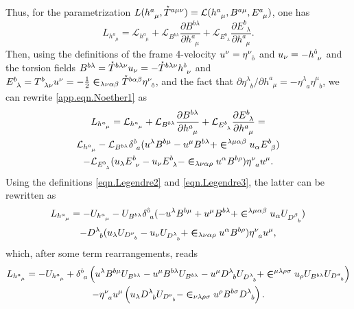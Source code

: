 \documentclass[
10pt, %
a4paper, %
oneside, %
headinclude,footinclude, %
BCOR5mm, %
]{scrartcl}
\newcommand{\tetrsymbol}{h}
\newcommand{\itetrsymbol}{\eta}
\newcommand{\itetr}[2]{\itetrsymbol^{#1}_{\phantom{#1}#2}}
\newcommand{\tetr}[2]{\tetrsymbol^{#1}_{\phantom{#1}#2}}
\newcommand{\Tors}[2]{T^{#1}_{\phantom{a}#2}}
\newcommand{\ET}[2]{E^{#1}_{\phantom{#1}#2}}	%
\newcommand{\Dm}[2]{D_{\phantom{#2}#1}^{#2}}	%
\newcommand{\BT}[2]{B^{#1#2}}	%
\newcommand{\Bm}[2]{B^{#1#2}}	%
\newcommand{\Laghodge}{L}%
\newcommand{\LagBE}{\mathcal{L}}%
\newcommand{\Um}{U}%
\newcommand{\LCsymb}{\bm{\in}}    %
\newcommand{\HDT}[1]{\accentset{\star}{T}^{#1}}
\newcommand{\KD}[2]{\delta^{#1}_{\ #2}}
\newcommand{\indalg}[1]{\hat{\mathsmaller{#1}}}
\begin{document}
Thus, for the parametrization
$ \Laghodge(\tetr{a}{\mu},\HDT{a\mu\nu}) = \LagBE(\tetr{a}{\mu},\BT{a}{\mu},\ET{a}{\mu}) $, one has
\begin{equation}\label{app.eqn.Noether1}
	\Laghodge_{\tetr{a}{\mu}} = \LagBE_{\tetr{a}{\mu}} 
	+ \LagBE_{\BT{b}{\lambda}} \frac{\partial \BT{b}{\lambda}}{\partial \tetr{a}{\mu}}
	+ \LagBE_{\ET{b}{\lambda}} \frac{\partial \ET{b}{\lambda}}{\partial \tetr{a}{\mu}}.
\end{equation}
Then, using the definitions of the frame 4-velocity $ u^\nu = \itetr{\nu}{\indalg{0}} $ and $ u_\nu 
= 
-\tetr{\indalg{0}}{\nu} $ and the torsion fields
$ \BT{b}{\lambda} = \HDT{b\lambda\nu} u_\nu = - \HDT{b\lambda\nu} \tetr{\indalg{0}}{\nu}$ and 
$ \ET{b}{\lambda} = \Tors{b}{\lambda\nu} u^\nu = 
-\frac12\LCsymb_{\lambda\nu\alpha\beta}\HDT{b\alpha\beta} \itetr{\nu}{\indalg{0}}$, and the 
fact 
that $ \partial\itetr{\lambda}{b}/\partial\tetr{a}{\mu} = -\itetr{\lambda}{a}\itetr{\mu}{b} $, we 
can rewrite \eqref{app.eqn.Noether1} as
\begin{multline}
	\Laghodge_{\tetr{a}{\mu}} = \LagBE_{\tetr{a}{\mu}} 
	+ \LagBE_{\BT{b}{\lambda}} \frac{\partial \BT{b}{\lambda}}{\partial \tetr{a}{\mu}}
	+ \LagBE_{\ET{b}{\lambda}} \frac{\partial \ET{b}{\lambda}}{\partial \tetr{a}{\mu}} = \\
	\LagBE_{\tetr{a}{\mu}} - \LagBE_{\BT{b}{\lambda}} \KD{\indalg{0}}{a}
	(u^\lambda \BT{b}{\mu} - u^\mu \BT{b}{\lambda}+\LCsymb^{\lambda\mu\alpha\beta} u_\alpha  
	\ET{b}{\beta}) \\
	-\LagBE_{\ET{b}{\lambda}} (u_\lambda \ET{b}{\nu} - u_\nu \ET{b}{\lambda} - 
	\LCsymb_{\lambda\nu\alpha\rho}u^\alpha\BT{b}{\rho})\itetr{\nu}{a}u^\mu.
\end{multline}
Using the definitions \eqref{eqn.Legendre2} and \eqref{eqn.Legendre3}, the latter can be rewritten 
as
\begin{multline}
	\Laghodge_{\tetr{a}{\mu}} =
	-\Um_{\tetr{a}{\mu}} 
	- \Um_{\Bm{b}{\lambda}} \KD{\indalg{0}}{a}
	(-u^\lambda \Bm{b}{\mu} + u^\mu \Bm{b}{\lambda}+\LCsymb^{\lambda\mu\alpha\beta} u_\alpha 
	\Um_{\Dm{b}{\beta}}) \\
	-\Dm{b}{\lambda} (u_\lambda \Um_{\Dm{b}{\nu}} - u_\nu \Um_{\Dm{b}{\lambda}} + 
	\LCsymb_{\lambda\nu\alpha\rho}u^\alpha\Bm{b}{\rho})\itetr{\nu}{a}u^\mu,
\end{multline}
which, after some term rearrangements, reads
\begin{multline}\label{eqn.J.BD}
	\Laghodge_{\tetr{a}{\mu}} =
	-\Um_{\tetr{a}{\mu}}
	+ \KD{\indalg{0}}{a}
	\left( 
	  u^\lambda \Bm{b}{\mu} \Um_{\Bm{b}{\lambda}} 
	- u^\mu \Bm{b}{\lambda} \Um_{\Bm{b}{\lambda}} 
	- u^\mu \Dm{b}{\lambda} \Um_{\Dm{b}{\lambda}}
	+ \LCsymb^{\mu\lambda\rho\sigma} u_\rho \Um_{\Bm{b}{\lambda}}
	\Um_{\Dm{b}{\sigma}} 
	\right) \\
	- \itetr{\nu}{a}u^\mu
	\left(
	u_\lambda \Dm{b}{\lambda} \Um_{\Dm{b}{\nu}} 
	- \LCsymb_{\nu\lambda\rho\sigma}u^\rho\Bm{b}{\sigma}\Dm{b}{\lambda}
	\right).
\end{multline}
\end{document}
